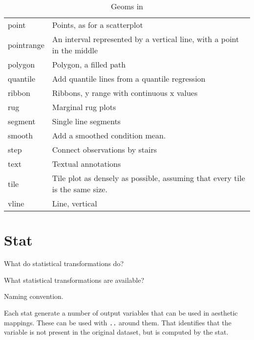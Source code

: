 \begin{table}
\begin{center}
\begin{tabular}{lp{3in}}
      point        & Points, as for a scatterplot                                                 \\
      pointrange   & An interval represented by a vertical line, with a point in the middle       \\
      polygon      & Polygon, a filled path                                                       \\
      quantile     & Add quantile lines from a quantile regression                                \\
      ribbon       & Ribbons, y range with continuous x values                                    \\
      rug          & Marginal rug plots                                                           \\
      segment      & Single line segments                                                         \\
      smooth       & Add a smoothed condition mean.                                               \\
      step         & Connect observations by stairs                                               \\
      text         & Textual annotations                                                          \\
      tile         & Tile plot as densely as possible, assuming that every tile is the same size. \\
      vline        & Line, vertical                                                               \\
  
      \bottomrule
  \end{tabular}
  \end{center}
  \caption{Geoms in \ggplot}
  \label{tbl:geoms}
\end{table}


\section{Stat}
\label{sec:stat}

What do statistical transformations do?

What statistical transformations are available?

Naming convention.

Each stat generate a number of output variables that can be used in aesthetic mappings.  These can be used with {\tt ..} around them.  That identifies that the variable is not present in the original dataset, but is computed by the stat.

